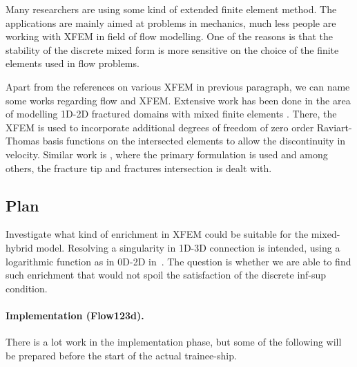 \documentclass{sna}
\begin{document}
Many researchers are using some kind of extended finite element method. The applications are mainly aimed
at problems in mechanics, much less people are working with XFEM in field of flow modelling. One of the reasons is
that the stability of the discrete mixed form is more sensitive on the choice of the finite elements used 
in flow problems. 

Apart from the references on various XFEM in previous paragraph, we can name some works regarding flow and XFEM.
Extensive work has been done in the area of modelling 1D-2D fractured domains with mixed finite elements
\cite{fumagalli_numerical_2012, dangelo_mixed_2012, fumagalli_efficient_2014}. There, the XFEM is used to incorporate
additional degrees of freedom of zero order Raviart-Thomas basis functions on the intersected elements to allow the discontinuity
in velocity. Similar work is \cite{schwenck_xfem-based_2015}, where the primary formulation is used and
among others, the fracture tip and fractures intersection is dealt with.


% 

\subsection{Plan}

Investigate what kind of enrichment in XFEM could be suitable for the mixed-hybrid model. Resolving a singularity
in 1D-3D connection is intended, using a logarithmic function as in 0D-2D in~\cite{exner_2015}.
The question is whether we are able to find such enrichment that would not spoil the satisfaction of 
the discrete inf-sup condition. 




\paragraph{Implementation (Flow123d).}
There is a lot work in the implementation phase, but some of the following will be prepared before the start
of the actual trainee-ship.
\end{document}
